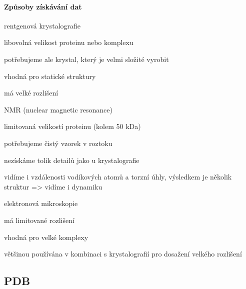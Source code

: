 \documentclass[DIV=8]{scrreprt}
\begin{document}
\paragraph{Způsoby získávání dat}
\begin{myItemize}[nosep]
    \item rentgenová krystalografie
\begin{myItemize}[nosep]
    \item libovolná velikost proteinu nebo komplexu
    \item potřebujeme ale krystal, který je velmi složité vyrobit
    \item vhodná pro statické struktury
    \item má velké rozlišení
\end{myItemize}

    \item NMR (nuclear magnetic resonance)
\begin{myItemize}[nosep]
    \item limitovaná velikostí proteinu (kolem 50 kDa)
    \item potřebujeme čistý vzorek v roztoku
    \item nezískáme tolik detailů jako u krystalografie
    \item vidíme i vzdálenosti vodíkových atomů a torzní úhly, výsledkem je několik struktur => vidíme i dynamiku
\end{myItemize}

    \item elektronová mikroskopie
\begin{myItemize}[nosep]
    \item má limitované rozlišení
    \item vhodná pro velké komplexy
    \item většinou používána v kombinaci s krystalografií pro dosažení velkého rozlišení
\end{myItemize}

\end{myItemize}




\subsection{PDB} \label{PDB}
\end{document}

